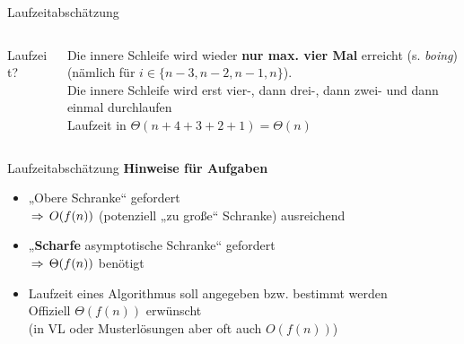 \begin{frame}{Laufzeitabschätzung}
	\begin{columns}[T] 
		\begin{column}[T]{.45\textwidth}
			\vspace{-\baselineskip} 
			\begin{exampleblock}{Laufzeit?}
				\begin{algorithm}[H]
				\end{algorithm}
			\end{exampleblock}
		\end{column}
		\pause
		\begin{column}[T]{.53\textwidth} 
			Die innere Schleife wird wieder \textbf{nur max. vier Mal} erreicht (s. \emph{boing})  \\ 
			(nämlich für $i \in \{n-3, n-2, n-1, n\}$). \\ 
			\smallskip \pause
			\impl Die innere Schleife wird erst vier-, dann drei-, dann zwei- und dann einmal durchlaufen \\ 
			\medskip
			\impl Laufzeit in $\Theta(n + 4+3+2+1) = \Theta(n)$
		\end{column}
	\end{columns}
	
\end{frame}

\begin{frame}{Laufzeitabschätzung}
	\textbf{Hinweise für Aufgaben} \\[0,25cm]
	\begin{itemize}
		\pause
		\item „Obere Schranke“ gefordert \\ 
		$\impl O(f(n))$ (potenziell „zu große“ Schranke) ausreichend
		\pause
		\item „\textbf{Scharfe} asymptotische Schranke“ gefordert \\ $\impl \Theta(f(n))$ benötigt
		\pause
		\item Laufzeit eines Algorithmus soll angegeben bzw. bestimmt werden \\ \impl Offiziell $\Theta(f(n))$ erwünscht \\ (in VL oder Musterlösungen aber oft auch $O(f(n))$)
	\end{itemize}
\end{frame}

